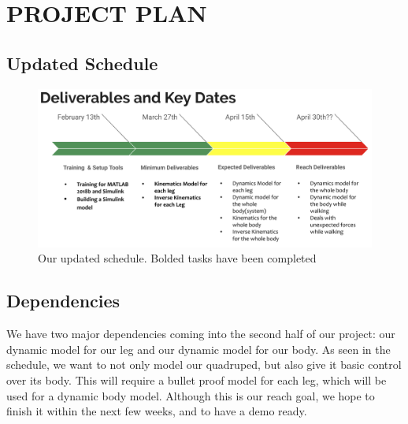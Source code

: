\section{PROJECT PLAN}
\subsection{Updated Schedule}
    \begin{figure}[thpb]
        \parbox{\linewidth}{\includegraphics[width=\linewidth]{Figures/UpdatedSchedule.png}}
        \caption{Our updated schedule. Bolded tasks have been completed}
        \label{fig:updatedschedule}
    \end{figure}
\subsection{Dependencies}
We have two major dependencies coming into the second half of our project: our dynamic model for our leg and our dynamic model for our body. As seen in the schedule, we want to not only model our quadruped, but also give it basic control over its body. This will require a bullet proof model for each leg, which will be used for a dynamic body model. Although this is our reach goal, we hope to finish it within the next few weeks, and to have a demo ready.

